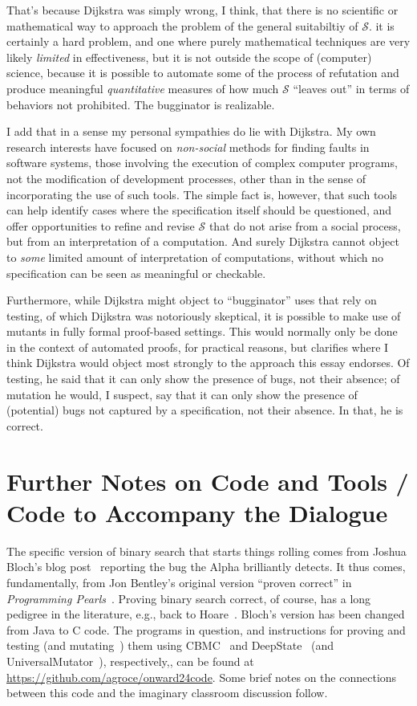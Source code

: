 \documentclass[sigplan]{acmart}
\begin{document}
That's because Dijkstra was simply wrong, I think, that there is no scientific or
mathematical way to approach the problem of the general suitabiltiy of
$\mathcal{S}$. it is certainly a hard problem, and one where purely mathematical
techniques are very likely \emph{limited} in effectiveness, but it is not outside the
scope of (computer) science, because it is possible to automate some of the
process of refutation and produce meaningful \emph{quantitative} measures of how much
$\mathcal{S}$ ``leaves out'' in terms of behaviors not prohibited.
The bugginator is realizable.


I add that in a sense my personal sympathies do lie with
Dijkstra.  My own research interests have focused on \emph{non-social} methods
for finding faults in software systems, those involving the execution
of complex computer programs, not the modification of development
processes, other than in the sense of incorporating the use of such tools.
The simple fact is, however, that such tools can help identify cases
where the specification itself should be questioned, and offer
opportunities to refine and revise $\mathcal{S}$ that do not arise
from a social process, but from an interpretation of a computation.
And surely Dijkstra cannot object to \emph{some} limited amount of
interpretation of computations, without which no specification can be
seen as meaningful or checkable.

Furthermore, while Dijkstra might object to ``bugginator'' uses that
rely on testing, of which Dijkstra was notoriously skeptical, it is
possible to make use of mutants in fully formal proof-based settings.  This would
normally only be done in the context of automated proofs, for
practical reasons, but clarifies where I think Dijkstra would object
most strongly to the approach this essay endorses.  Of testing, he said that it can only show the presence
of bugs, not their absence; of mutation he would, I suspect, say that
it can only show the presence of (potential) bugs not captured by a
specification, not their absence.  In that, he is correct.

\section{Further Notes on Code and Tools / Code to Accompany the Dialogue}

The specific version of binary search that starts things rolling comes from Joshua Bloch's blog post~\cite{bloch} reporting
the bug the Alpha brilliantly detects.  It thus comes, fundamentally, from Jon Bentley's original version ``proven
correct'' in \emph{Programming Pearls}~\cite{Pearls}. Proving binary
search correct, of course, has a long pedigree in the literature, e.g., back to
Hoare~\cite{hoare1971proof}.  Bloch's version  has
been changed from Java to C code.  The programs in question, and instructions
for proving and testing (and mutating~\cite{MutationSurvey}) them using CBMC~\cite{CBMCp} and
DeepState~\cite{goodman2018deepstate} (and UniversalMutator~\cite{SyntaxUM}), respectively,, can be found at
\url{https://github.com/agroce/onward24code}.  Some brief notes on the
connections between this code and the imaginary classroom discussion follow.
\end{document}

